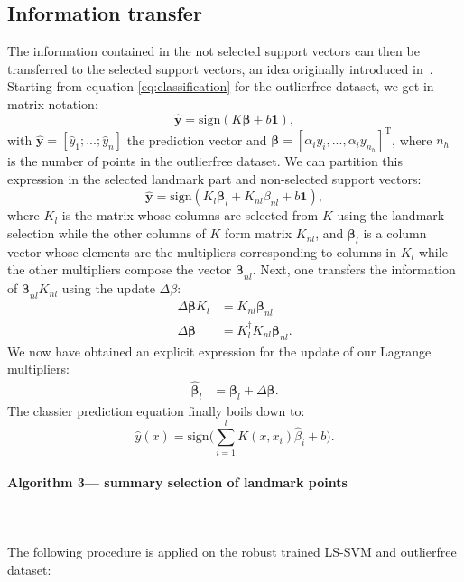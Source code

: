 \documentclass[preprint,12pt]{elsarticle}
\begin{document}
	\subsection{Information transfer}
	The information contained in the not selected support vectors can then be transferred to the selected support vectors, an idea originally introduced in~\cite{tao2009fast}. Starting from equation \eqref{eq:classification} for the outlierfree dataset, we get in matrix notation:	
	\begin{equation}
\hat{\mathbf{y}} = \mathrm{sign}(K\mathbf{\beta}  + b \mathbf{1}),
	\end{equation}
with $\hat{\mathbf{y}} = [\hat{y}_1;...;\hat{y}_n]$ the prediction vector and $\mathbf{\beta} = [\alpha_i y_i ,...,\alpha_i y_{n_h}]^\mathrm{T}$, where $n_h$ is the number of points in the outlierfree dataset.
We can partition this expression in the selected landmark part and non-selected support vectors:
	\begin{equation}
\hat{\mathbf{y}} = \mathrm{sign}(K_l\mathbf{\beta}_l + K_{nl}\beta_{nl}  + b \mathbf{1}),
	\end{equation}
	where $K_l $ is the matrix whose columns are selected from $K$ using the landmark selection while the other columns of $K$ form matrix $K_{nl}$, and $\mathbf{\beta}_l$ is a column vector whose elements are the multipliers corresponding to columns in $K_l $ while the other multipliers compose the vector $ \mathbf{\beta}_{nl}$.
	Next, one transfers the information of $\mathbf{\beta}_{nl} K_{nl}$ using the update $\Delta\beta$: 
	\begin{align}
	\Delta \mathbf{\beta} K_l &= K_{nl} \mathbf{\beta}_{nl}   \\
	\Delta \mathbf{\beta} &= K^\dagger_l  K_{nl} \mathbf{\beta}_{nl} .
	\end{align}
	We now have obtained an explicit expression for the update of our Lagrange multipliers:
	\begin{align}
	\hat{\mathbf{\beta}}_l &=\mathbf{\beta}_l + \Delta \mathbf{\beta}.
	\end{align}
 The classier prediction equation finally boils down to:
	\begin{equation}
\hat{y}(x) = \mathrm{sign}\Big(\sum_{i=1}^{l} K(x, x_i)\hat{\beta}_i  + b\Big).	
	\end{equation}
	
	\paragraph{Algorithm 3--- summary selection of landmark points} 
	\hfill \\\\
	The following procedure is applied on the robust trained LS-SVM and outlierfree dataset:
	
\end{document}

